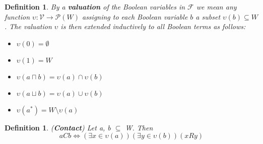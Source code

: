 \documentclass{article}
\newcommand\F{\mathcal{F}}
\newcommand\p{\mathcal{P}}
\newcommand\V{\mathcal{V}}
\newtheorem{defn}[theorem]{Definition}
\begin{document}
	\begin{defn}
		\label{valuation}
		By a \textbf{\textit{valuation}} of the Boolean variables in $\F$ we mean any function $\upsilon : \V \rightarrow \p(W)$ assigning to each Boolean variable $b$ a subset $\upsilon(b) \subseteq W$. The valuation $\upsilon$ is then extended inductively to all Boolean terms as follows:

		\begin{itemize}
			\item $\upsilon(0) = \emptyset$
			\item $\upsilon(1) = W$
			\item $\upsilon(a \sqcap b) = \upsilon(a) \cap \upsilon(b)$
			\item $\upsilon(a \sqcup b) = \upsilon(a) \cup \upsilon(b)$
			\item $\upsilon(a^*) = W \setminus \upsilon(a)$
		\end{itemize}
	\end{defn}

	\begin{defn} (\textbf{Contact})
	Let a, b $\subseteq$ W. Then
		\begin{equation}
			aCb \iff (\exists x \in \upsilon(a))(\exists y \in \upsilon(b))(xRy)
		\end{equation}
	\end{defn}
\end{document}
